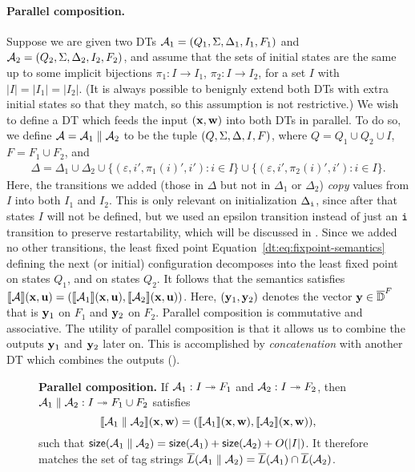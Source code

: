 \paragraph*{Parallel composition.}
Suppose we are given two DTs $\mathcal{A}_1 = (Q_{1}, \Sigma, \Delta_{1}, I_{1}, F_{1})$ and $\mathcal{A}_2 = (Q_{2}, \Sigma, \Delta_{2}, I_{2}, F_{2})$, and assume that the sets of initial states are the same up to some implicit bijections $\pi_1: I \to I_1$, $\pi_2: I \to I_2$, for a set $I$ with $|I| = |I_1| = |I_2|$. (It is always possible to benignly extend both DTs with extra initial states so that they match, so this assumption is not restrictive.)
We wish to define a DT which feeds the input $(\mathbf{x},\mathbf{w})$ into both DTs in parallel. To do so, we define $\mathcal{A} = \mathcal{A}_1 \; \| \; \mathcal{A}_2$ to be the tuple $(Q, \Sigma, \Delta, I, F){}$, where $Q = Q_1 \cup Q_2 \cup I$, $F = F_1 \cup F_2$, and
\begin{align*}
\Delta = \Delta_1 \cup \Delta_2
    \cup \big\{(\varepsilon, i', \pi_1(i)', i') : i \in I \big\}
    \cup \big\{(\varepsilon, i', \pi_2(i)', i') : i \in I \big\}.
\end{align*}
Here, the transitions we added (those in $\Delta$ but not in $\Delta_1$ or $\Delta_2$) \emph{copy} values from $I$ into both $I_1$ and $I_2$. This is only relevant on initialization $\Delta_{\texttt{i}}$, since after that states $I$ will not be defined, but we used an epsilon transition instead of just an ${\texttt{i}}$ transition to preserve restartability, which will be discussed in . Since we added no other transitions, the least fixed point Equation~\eqref{dt:eq:fixpoint-semantics} defining the next (or initial) configuration decomposes into the least fixed point on states $Q_1$, and on states $Q_2$. It follows that the semantics satisfies $\llbracket \mathcal{A} \rrbracket(\mathbf{x},\mathbf{u}) = (\llbracket \mathcal{A}_1 \rrbracket(\mathbf{x},\mathbf{u}),\llbracket \mathcal{A}_2 \rrbracket(\mathbf{x},\mathbf{u}))$. Here, $(\mathbf{y}_1,\mathbf{y}_2)$ denotes the vector $\mathbf{y} \in \overline{\mathbb{D}{}}^F$ that is $\mathbf{y}_1$ on $F_1$ and $\mathbf{y}_2$ on $F_2$.
Parallel composition is commutative and associative.
The utility of parallel composition is that it allows us to combine the outputs $\mathbf{y}_1$ and $\mathbf{y}_2$ later on. This is accomplished by \emph{concatenation} with another DT which combines the outputs ().

\begin{figure}[H]
\begin{dtbox}
\textbf{Parallel composition.}
If $\mathcal{A}_1: I \twoheadrightarrow F_1$ and $\mathcal{A}_2: I \twoheadrightarrow F_2$,
then $\mathcal{A}_1 \; \| \; \mathcal{A}_2 : I \twoheadrightarrow F_1 \cup F_2$ satisfies
\[
\llbracket \mathcal{A}_1 \; \| \; \mathcal{A}_2 \rrbracket(\mathbf{x},\mathbf{w}) = (\llbracket \mathcal{A}_1 \rrbracket(\mathbf{x},\mathbf{w}),\llbracket \mathcal{A}_2 \rrbracket(\mathbf{x},\mathbf{w})),
\]
such that $\mathsf{size}(\mathcal{A}_1 \; \| \; \mathcal{A}_2) = \mathsf{size}(\mathcal{A}_1) + \mathsf{size}(\mathcal{A}_2) + O(|I|)$.
It therefore matches the set of tag strings
$\overline{L}(\mathcal{A}_1 \; \| \; \mathcal{A}_2) = \overline{L}(\mathcal{A}_1) \cap \overline{L}(\mathcal{A}_2)$.
\end{dtbox}

\label{dt:fig:parallel-composition}
\end{figure}

